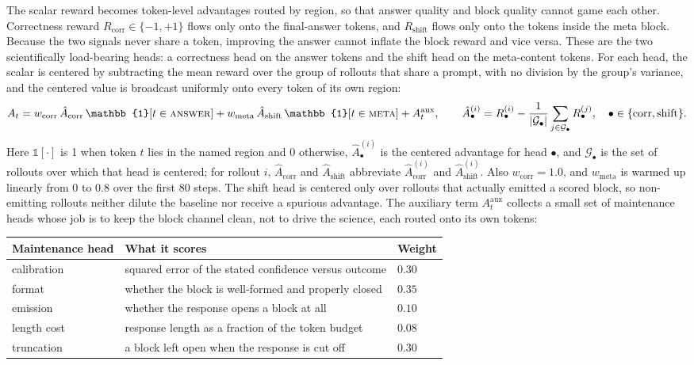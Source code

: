The scalar reward becomes token-level advantages routed by region, so that
answer quality and block quality cannot game each other. Correctness reward
$R_{\mathrm{corr}}\in\{-1,+1\}$ flows
only onto the final-answer tokens, and $R_{\mathrm{shift}}$ flows only onto the
tokens inside the meta block. Because the two signals never share a token,
improving the answer cannot inflate the block reward and vice versa. These are
the two scientifically load-bearing heads: a correctness head on the answer
tokens and the shift head on the meta-content tokens. For each head, the scalar
is centered by subtracting the mean reward over the group of rollouts that share
a prompt, with no division by the group's variance, and the centered value is
broadcast uniformly onto every token of its own region:
\begin{equation}
A_{t}
= w_{\mathrm{corr}}\, \hat{A}_{\mathrm{corr}}\, \mathbb{1}[t \in \textsc{answer}]
+ w_{\mathrm{meta}}\, \hat{A}_{\mathrm{shift}}\, \mathbb{1}[t \in \textsc{meta}]
+ A^{\mathrm{aux}}_{t},
\qquad
\hat{A}^{(i)}_{\bullet} = R^{(i)}_{\bullet} - \frac{1}{|\mathcal{G}_{\bullet}|}\sum_{j\in\mathcal{G}_{\bullet}} R^{(j)}_{\bullet},
\quad \bullet\in\{\mathrm{corr},\mathrm{shift}\}.
\label{eq:routing}
\end{equation}
Here $\mathbb{1}[\cdot]$ is 1 when token $t$ lies in the named region and 0
otherwise, $\hat{A}^{(i)}_{\bullet}$ is the centered advantage for head $\bullet$,
and $\mathcal{G}_{\bullet}$ is the set of rollouts over which that head is
centered; for rollout $i$, $\hat{A}_{\mathrm{corr}}$ and $\hat{A}_{\mathrm{shift}}$
abbreviate $\hat{A}^{(i)}_{\mathrm{corr}}$ and $\hat{A}^{(i)}_{\mathrm{shift}}$.
Also $w_{\mathrm{corr}} = 1.0$, and $w_{\mathrm{meta}}$ is
warmed up linearly from $0$ to $0.8$ over the first $80$ steps. The shift head is
centered only over rollouts that actually emitted a scored block, so
non-emitting rollouts neither dilute the baseline nor receive a spurious
advantage. The auxiliary term $A^{\mathrm{aux}}_{t}$ collects a small set of
maintenance heads whose job is to keep the block channel clean, not to drive the
science, each routed onto its own tokens:
\begin{center}
\begin{tabular}{@{}lll@{}}
\toprule
Maintenance head & What it scores & Weight \\
\midrule
calibration & squared error of the stated confidence versus outcome & $0.30$ \\
format      & whether the block is well-formed and properly closed  & $0.35$ \\
emission    & whether the response opens a block at all             & $0.10$ \\
length cost & response length as a fraction of the token budget     & $0.08$ \\
truncation  & a block left open when the response is cut off        & $0.30$ \\
\bottomrule
\end{tabular}
\end{center}
